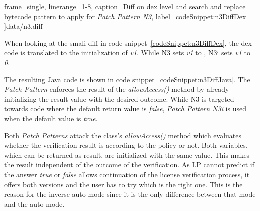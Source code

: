  frame=single,
 linerange={1-8},
 caption={Diff on dex level and search and replace bytecode pattern to apply for \textit{Patch Pattern N3}},
 label={codeSnippet:n3DiffDex}
]{data/n3.diff}


When looking at the smali diff in code snippet~\ref{codeSnippet:n3DiffDex}, the dex code is translated to the initialization of \textit{v1}.
While N3 sets \textit{v1} to , N3i sets \textit{v1} to \textit{0}.
\newline

The resulting Java code is shown in code snippet~\ref{codeSnippet:n3DiffJava}.
The \textit{Patch Pattern} enforces the result of the \textit{allowAccess()} method by already initializing the result value with the desired outcome.
While N3 is targeted towards code where the default return value is \textit{false}, \textit{Patch Pattern N3i} is used when the default value is \textit{true}.
\newline

Both \textit{Patch Patterns} attack the class's \textit{allowAccess()} method which evaluates whether the verification result is according to the policy or not.
Both variables, which can be returned as result, are initialized with the same value.
This makes the result independent of the outcome of the verification.
As LP cannot predict if the answer \textit{true} or \textit{false} allows continuation of the license verification process, it offers both versions and the user has to try which is the right one.
This is the reason for the inverse auto mode since it is the only difference between that mode and the auto mode.

